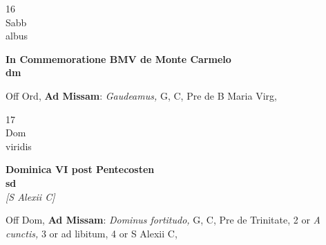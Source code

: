 \documentclass[10pt, openany]{book}
\begin{document}
        \begin{center}
            \begin{minipage}{3.5in}
                \vspace{2em}
                \begin{minipage}{0.5in}
                    {\Huge 16} \\
                    {\normalsize Sabb} \\
                    {\normalsize albus}
                \end{minipage}
                \begin{minipage}{3.0in}
                    \textbf{ \large In Commemoratione BMV de Monte Carmelo \\
                    \textnormal{\normalsize dm}} \\ 
                \end{minipage}
                \begin{justify}Off Ord, \textbf{Ad Missam}: \textit{Gaudeamus,} G, C, Pre  de B Maria Virg,  
                \end{justify}
            \end{minipage}
        \end{center}
    
        \begin{center}
            \begin{minipage}{3.5in}
                \vspace{2em}
                \begin{minipage}{0.5in}
                    {\Huge 17} \\
                    {\normalsize Dom} \\
                    {\normalsize viridis}
                \end{minipage}
                \begin{minipage}{3.0in}
                    \textbf{ \large Dominica VI post Pentecosten \\
                    \textnormal{\normalsize sd}} \\ \textit{[S Alexii C]} \\ 
                \end{minipage}
                \begin{justify}Off Dom, \textbf{Ad Missam}: \textit{Dominus fortitudo,} G, C, Pre de Trinitate, 2 or \textit{A cunctis,} 3 or ad libitum, 4 or S Alexii C,  
                \end{justify}
            \end{minipage}
        \end{center}
    
\end{document}
